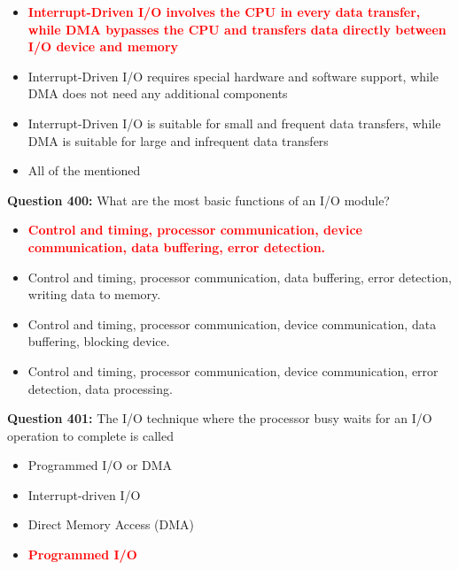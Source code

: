 \documentclass[12pt,a4paper]{article}
\begin{document}
\begin{itemize}
    \item[\textbf{A.}] \textcolor{red}{\textbf{Interrupt-Driven I/O involves the CPU in every data transfer, while DMA bypasses the CPU and transfers data directly between I/O device and memory}}
    \item[\textbf{B.}] Interrupt-Driven I/O requires special hardware and software support, while DMA does not need any additional components
    \item[\textbf{C.}] Interrupt-Driven I/O is suitable for small and frequent data transfers, while DMA is suitable for large and infrequent data transfers
    \item[\textbf{D.}] All of the mentioned
\end{itemize}

\vspace{0.5cm}

\vspace{0.5cm}

\textbf{Question 400:} What are the most basic functions of an I/O module?

\begin{itemize}
    \item[\textbf{A.}] \textcolor{red}{\textbf{Control and timing, processor communication, device communication, data buffering, error detection.}}
    \item[\textbf{B.}] Control and timing, processor communication, data buffering, error detection, writing data to memory.
    \item[\textbf{C.}] Control and timing, processor communication, device communication, data buffering, blocking device.
    \item[\textbf{D.}] Control and timing, processor communication, device communication, error detection, data processing.
\end{itemize}

\vspace{0.5cm}

\vspace{0.5cm}

\textbf{Question 401:} The I/O technique where the processor busy waits for an I/O operation to complete is called \underline{\hspace{1.5cm}}

\begin{itemize}
    \item[\textbf{A.}] Programmed I/O or DMA
    \item[\textbf{B.}] Interrupt-driven I/O
    \item[\textbf{C.}] Direct Memory Access (DMA)
    \item[\textbf{D.}] \textcolor{red}{\textbf{Programmed I/O}}
\end{itemize}
\end{document}
